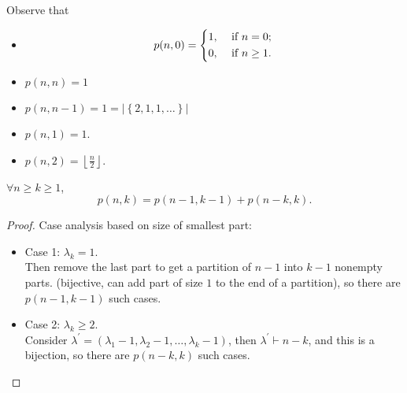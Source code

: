 Observe that 
\begin{itemize}
    \item
    \[
        p(n, 0) = \begin{dcases}
            1, &\text{ if } n=0 ;\\
            0, &\text{ if } n \ge 1.
        \end{dcases}
    \]
    \item \(p(n, n) = 1\) 
    \item \(p(n, n-1) = 1  = \vert \left\{ 2,1,1,\dots  \right\}  \vert \)  
    \item \(p(n, 1) = 1\). 
    \item \(p(n, 2) = \left\lfloor \frac{n}{2} \right\rfloor\).  
\end{itemize}

\begin{proposition}
    \(\forall n \ge k \ge 1\),
    \[
        p(n, k) = p(n - 1, k - 1) + p(n - k, k).
    \] 
\end{proposition}
\begin{proof}
    Case analysis based on size of smallest part: 
    \begin{itemize}
        \item Case 1: \(\lambda _k = 1\). \\
        Then remove the last part to get a partition of \(n-1\) into \(k-1\) nonempty parts. (bijective, can add part of size \(1\) to the end of a partition), so there are \(p(n-1, k-1)\) such cases.  
        \item Case 2: \(\lambda _k \ge 2\). \\
        Consider \(\lambda ^{\prime} = (\lambda _1 -1, \lambda _2 - 1, \dots , \lambda _k - 1)\), then \(\lambda ^{\prime}  \vdash n - k\), and this is a bijection, so there are \(p(n-k, k)\) such cases.  
    \end{itemize}
\end{proof}

